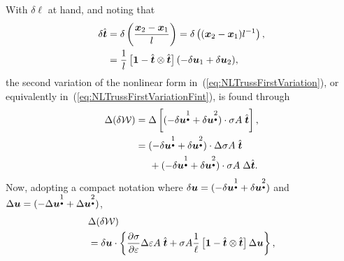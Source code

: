 {With $\delta \ell$ at hand, and noting that
\begin{align}
 \delta \hat{\mbox{\boldmath $t$}} & = \delta \left(
 \frac{\mbox{\boldmath $x$}_2 - \mbox{\boldmath $x$}_1}{l}\right) = \delta 
 \left((\mbox{\boldmath $x$}_2 - \mbox{\boldmath $x$}_1)l^{-1} \right), \\
  & = \frac{1}{l}\left[\mbox{\boldmath $1$} - \hat{\mbox{\boldmath $t$}} \otimes \hat{\mbox{\boldmath $t$}}
  \right] (-\delta \mbox{\boldmath $u$}_1 + \delta \mbox{\boldmath $u$}_2),
\end{align} 
the second variation of the nonlinear form in~(\ref{eq:NLTrussFirstVariation}), 
or equivalently in~(\ref{eq:NLTrussFirstVariationFint}), 
is found through
\begin{align}
  \Delta (\delta \mathcal{W}) 
   & = \Delta \left[(- \delta \mbox{\boldmath $u$}^{\underset{\bullet}{1}} + 
   \delta \mbox{\boldmath $u$}^{\underset{\bullet}{2}} ) \cdot \sigma A \; \hat{\mbox{\boldmath $t$}} \right], \\
   & = (- \delta \mbox{\boldmath $u$}^{\underset{\bullet}{1}} 
   + \delta \mbox{\boldmath $u$}^{\underset{\bullet}{2}} ) 
   \cdot \Delta \sigma A \; \hat{\mbox{\boldmath $t$}} \nonumber \\
   & \hspace{0.5cm} + (- \delta \mbox{\boldmath $u$}^{\underset{\bullet}{1}} + \delta \mbox{\boldmath $u$}^{\underset{\bullet}{2}} ) \cdot \sigma A \; \Delta \hat{\mbox{\boldmath $t$}}.
\end{align}
Now, adopting a compact notation where 
$\delta \mbox{\boldmath $u$} = 
(- \delta \mbox{\boldmath $u$}^{\underset{\bullet}{1}} + \delta \mbox{\boldmath $u$}^{\underset{\bullet}{2}} )$ 
and 
$\Delta \mbox{\boldmath $u$} = (- \Delta \mbox{\boldmath $u$}^{\underset{\bullet}{1}} + \Delta \mbox{\boldmath $u$}^{\underset{\bullet}{2}} )$,
\begin{align}
 &\Delta (\delta \cW) \nonumber \\
 &= \delta \vu \cdot 
 \left\{ 
  \dst\frac{\partial \sigma}{\partial \hstrain} \Delta \hstrain A \; \vthat     
   +
  \sigma A \frac{1}{\ell}\left[\vid - \vthat \otimes \vthat
 \right] \Delta \vu
 \right\}, \\

\end{align}}
